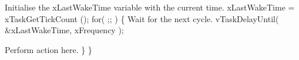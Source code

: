 \begin{DoxyPre}Initialise the xLastWakeTime variable with the current time.
         xLastWakeTime = xTaskGetTickCount ();
         for( ;; )
         \{
Wait for the next cycle.
                 vTaskDelayUntil( &xLastWakeTime, xFrequency );\end{DoxyPre}



\begin{DoxyPre}Perform action here.
         \}
 \}
   \end{DoxyPre}
 